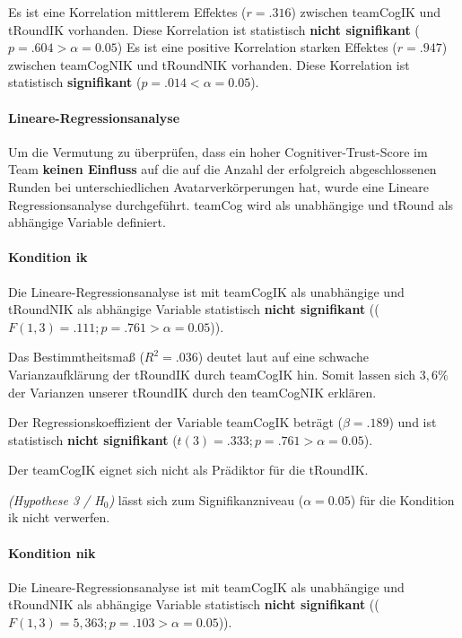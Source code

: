 \documentclass[a4paper,11pt]{article}%
\renewcommand{\\}{\vspace*{0.5\baselineskip} \newline}
\begin{document}
Es ist eine Korrelation mittlerem Effektes ($r = .316$) zwischen \ac{teamCogIK} und \ac{tRoundIK} vorhanden. Diese Korrelation ist statistisch \textbf{nicht signifikant} ($p = .604 > \alpha = 0.05$)
Es ist eine positive Korrelation starken Effektes ($r = .947$) zwischen \ac{teamCogNIK} und \ac{tRoundNIK} vorhanden. Diese Korrelation ist statistisch \textbf{signifikant} ($p = .014 < \alpha = 0.05$). 

\paragraph{Lineare-Regressionsanalyse}
Um die Vermutung zu überprüfen, dass ein hoher Cognitiver-Trust-Score im Team  \textbf{keinen Einfluss} auf die auf die Anzahl der erfolgreich abgeschlossenen Runden bei unterschiedlichen Avatarverkörperungen hat, wurde eine Lineare Regressionsanalyse durchgeführt.
\ac{teamCog} wird als unabhängige und \ac{tRound} als abhängige Variable definiert.

\paragraph{Kondition \ac{ik}}
Die Lineare-Regressionsanalyse ist mit \ac{teamCogIK} als unabhängige und \ac{tRoundNIK} als abhängige Variable statistisch \textbf{nicht signifikant} (($F(1,3) = .111; p = .761 > \alpha = 0.05$)).

Das Bestimmtheitsmaß ($R^{2} = .036$) deutet laut \citep{cohen2013statistical} auf eine schwache Varianzaufklärung der \ac{tRoundIK} durch \ac{teamCogIK} hin. Somit lassen sich $3,6\%$ der Varianzen unserer \ac{tRoundIK} durch den \ac{teamCogNIK} erklären.

Der Regressionskoeffizient der Variable \ac{teamCogIK} beträgt ($\beta = .189$) und ist statistisch \textbf{nicht signifikant} ($t(3) = .333; p = .761 > \alpha = 0.05$).

Der \ac{teamCogIK} eignet sich nicht als Prädiktor für die \ac{tRoundIK}.

\textit{(Hypothese 3 / H$_{0}$)} lässt sich zum Signifikanzniveau ($\alpha = 0.05$) für die Kondition \ac{ik} nicht verwerfen.

\paragraph{Kondition \ac{nik}}
Die Lineare-Regressionsanalyse ist mit \ac{teamCogIK} als unabhängige und \ac{tRoundNIK} als abhängige Variable statistisch \textbf{nicht signifikant} (($F(1,3) = 5,363; p = .103 > \alpha = 0.05$)).
\end{document}
